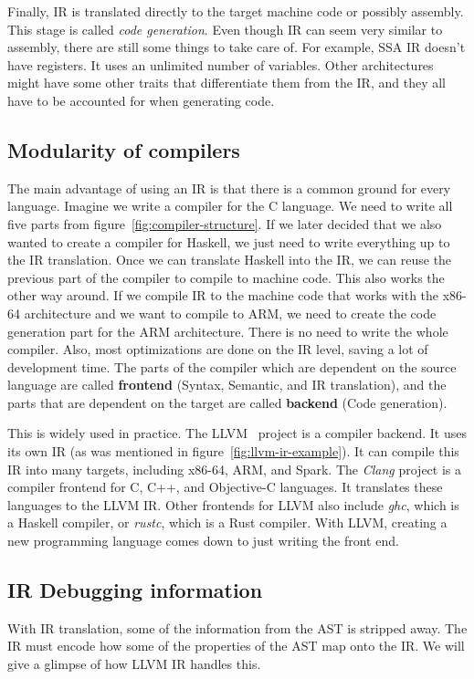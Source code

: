 Finally, IR is translated directly to the target machine code or possibly
assembly. This stage is called \textit{code generation}. Even though IR can
seem very similar to assembly, there are still some things to take care of. For
example, SSA IR doesn't have registers. It uses an unlimited number of
variables. Other architectures might have some other traits that differentiate
them from the IR, and they all have to be accounted for when generating code.

\subsection{Modularity of compilers}
The main advantage of using an IR is that there is a common ground for every
language. Imagine we write a compiler for the C language. We need to write all
five parts from figure~\ref{fig:compiler-structure}. If we later decided that
we also wanted to create a compiler for Haskell, we just need to write
everything up to the IR translation. Once we can translate Haskell into the IR,
we can reuse the previous part of the compiler to compile to machine code. This
also works the other way around. If we compile IR to the machine code that
works with the x86-64 architecture and we want to compile to ARM, we need to
create the code generation part for the ARM architecture. There is no need to
write the whole compiler. Also, most optimizations are done on the IR level,
saving a lot of development time. The parts of the compiler which are dependent
on the source language are called \textbf{frontend} (Syntax, Semantic, and IR
translation), and the parts that are dependent on the target are called
\textbf{backend} (Code generation).

This is widely used in practice. The LLVM~\cite{llvm} project is a compiler
backend. It uses its own IR (as was mentioned in
figure~\ref{fig:llvm-ir-example}). It can compile this IR into many targets,
including x86-64, ARM, and Spark. The \textit{Clang} project is a compiler
frontend for C, C++, and Objective-C languages. It translates these languages
to the LLVM IR. Other frontends for LLVM also include \textit{ghc}, which is a
Haskell compiler, or \textit{rustc}, which is a Rust compiler. With LLVM,
creating a new programming language comes down to just writing the front end.

\subsection{IR Debugging information}
With IR translation, some of the information from the AST is stripped away. The
IR must encode how some of the properties of the AST map onto the IR. We will
give a glimpse of how LLVM IR handles this.

